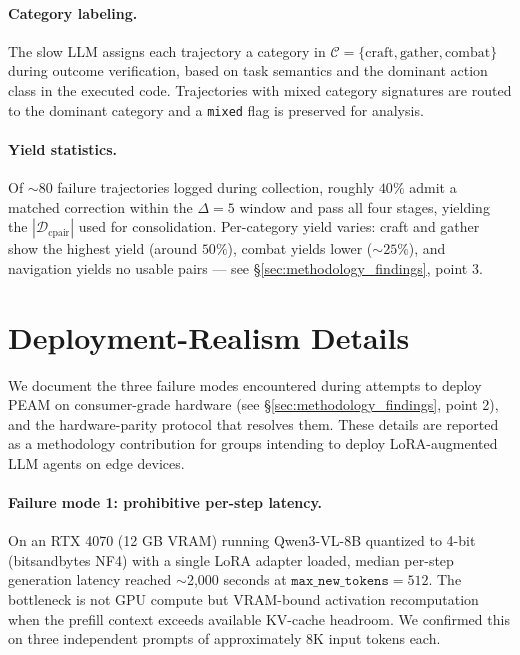 \documentclass[11pt]{article}
\begin{document}
\paragraph{Category labeling.} The slow LLM assigns each
trajectory a category in $\mathcal{C} = \{\text{craft},
\text{gather}, \text{combat}\}$ during outcome verification,
based on task semantics and the dominant action class in
the executed code. Trajectories with mixed category
signatures are routed to the dominant category and a
\texttt{mixed} flag is preserved for analysis.

\paragraph{Yield statistics.} Of $\sim$80 failure
trajectories logged during collection,                %
roughly $40\%$ admit a matched correction within the
$\Delta=5$ window and pass all four stages,           %
yielding the $|\mathcal{D}_{\text{cpair}}|$ used for
consolidation. Per-category yield varies: craft and
gather show the highest yield (around $50\%$),        %
combat yields lower ($\sim 25\%$),                    %
and navigation yields no usable pairs --- see
\S\ref{sec:methodology_findings}, point 3.

\section{Deployment-Realism Details}
\label{app:deployment}

We document the three failure modes encountered during
attempts to deploy PEAM on consumer-grade hardware
(see \S\ref{sec:methodology_findings}, point 2), and the
hardware-parity protocol that resolves them. These details
are reported as a methodology contribution for groups
intending to deploy LoRA-augmented LLM agents on edge
devices.

\paragraph{Failure mode 1: prohibitive per-step latency.}
On an RTX 4070 (12 GB VRAM) running Qwen3-VL-8B quantized
to 4-bit (bitsandbytes NF4) with a single LoRA adapter
loaded, median per-step generation latency reached
$\sim$2,000 seconds at $\texttt{max\_new\_tokens} = 512$.  %
The bottleneck is not GPU compute but VRAM-bound activation
recomputation when the prefill context exceeds available
KV-cache headroom. We confirmed this on three independent
prompts of approximately 8K input tokens each.            %
\end{document}
